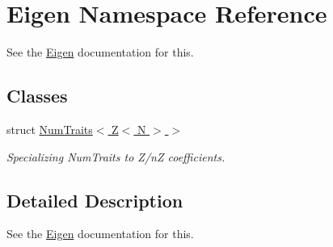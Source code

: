 \hypertarget{namespaceEigen}{}\section{Eigen Namespace Reference}
\label{namespaceEigen}


See the \hyperlink{namespaceEigen}{Eigen} documentation for this.  


\subsection*{Classes}
\begin{DoxyCompactItemize}
\item 
struct \hyperlink{structEigen_1_1NumTraits_3_01Z_3_01N_01_4_01_4}{Num\+Traits$<$ Z$<$ N $>$ $>$}
\begin{DoxyCompactList}\small\item\em Specializing Num\+Traits to Z/nZ coefficients. \end{DoxyCompactList}\end{DoxyCompactItemize}


\subsection{Detailed Description}
See the \hyperlink{namespaceEigen}{Eigen} documentation for this. 